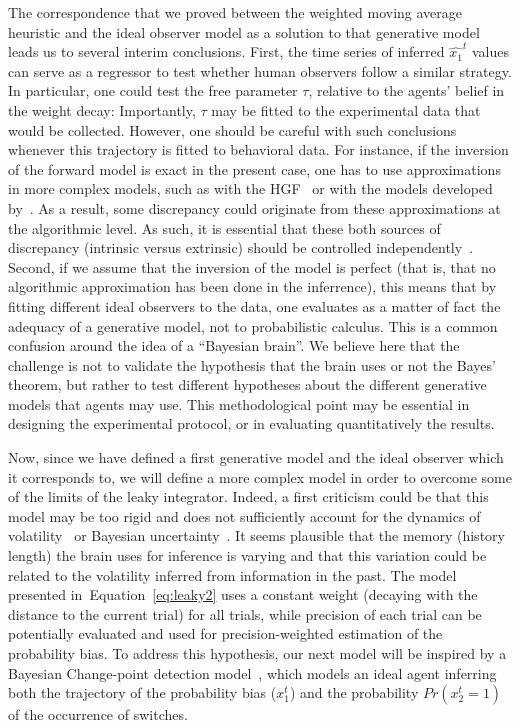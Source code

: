 \documentclass[12pt,english]{article}%
\newcommand{\citep}[1]{\parencite{#1}}
\newcommand{\citet}[1]{\textcite{#1}}
\newcommand{\seeFig}[1]{Figure~\ref{fig:#1}}
\newcommand{\seeEq}[1]{Equation~\ref{eq:#1}}
\begin{document}
The correspondence that we proved between the weighted moving average heuristic
and the ideal observer model as a solution to that generative model leads
us to several interim conclusions.
First, the time series of inferred $\hat{x_1}^{t}$ values can serve as a regressor
to test whether human observers follow a similar strategy.
In particular, one could test the free parameter $\tau$,
relative to the agents' belief in the weight decay:
Importantly, $\tau$ may be fitted to the experimental data
that would be collected.
However, one should be careful with such conclusions whenever
this trajectory is fitted to behavioral data.
For instance, if the inversion of the forward model is exact in the present case,
one has to use approximations in more complex models,
such as with the HGF~\citep{Mathys11}
or with the models developed by~\citet{Wilson13,Wilson18}.
As a result, some discrepancy could originate from these approximations
at the algorithmic level.
As such, it is essential that these both sources of discrepancy (intrinsic versus extrinsic)
should be controlled independently~\citep{Beck12}.
Second, if we assume that the inversion of the model is perfect
(that is, that no algorithmic approximation has been done in the inferrence),
this means that by fitting different ideal observers
to the data, one evaluates as a matter of fact the adequacy of
a generative model, not to probabilistic calculus.
This is a common confusion around the idea of a ``Bayesian brain''.
We believe here that the challenge is not to validate the hypothesis that the brain uses or not the Bayes' theorem,
but rather to test different hypotheses
about the different generative models
that agents may use.
This methodological point may be essential in designing the experimental protocol,
or in evaluating quantitatively the results.

Now, since we have defined a first generative model
and the ideal observer which it corresponds to,
we will define a more complex model
in order to overcome some of the limits of the leaky integrator.
Indeed, a first criticism could be that
this model may be too rigid and does not sufficiently
account for the dynamics of volatility~\citep{Behrens07}
or Bayesian uncertainty~\citep{Vilares2011}.
It seems plausible that the memory (history length) the brain uses
for inference is varying and that this variation could be related
to the volatility inferred from information in the past.
The model presented in~\seeEq{leaky2} uses a constant weight
(decaying with the distance to the current trial)
for all trials, while precision of each trial
can be potentially evaluated and used
for precision-weighted estimation of the probability bias.
To address this hypothesis, our next model will be inspired
by a Bayesian Change-point detection model~\citep{AdamsMackay2007},
which models an ideal agent inferring
both the trajectory of the probability bias ($x_1^t$)
and the probability $Pr(x_2^t=1)$ of the occurrence of switches.
\end{document}
